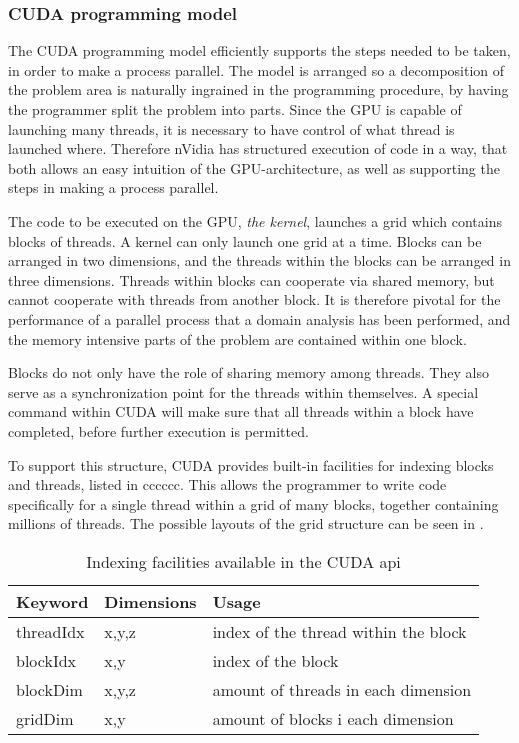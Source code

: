 \subsubsection{CUDA programming model}
The CUDA programming model efficiently supports the steps needed to be taken, in order to make a process parallel. The model is arranged so a decomposition of the problem area is naturally ingrained in the programming procedure, by having the programmer split the problem into parts. Since the GPU is capable of launching many threads, it is necessary to have control of what thread is launched where. Therefore nVidia has structured execution of code in a way, that both allows an easy intuition of the GPU-architecture, as well as supporting the steps in making a process parallel.

The code to be executed on the GPU, \emph{the kernel}, launches a grid which contains blocks of threads. A kernel can only launch one grid at a time. Blocks can be arranged in two dimensions, and the threads within the blocks can be arranged in three dimensions. Threads within blocks can cooperate via shared memory, but cannot cooperate with threads from another block. It is therefore pivotal for the performance of a parallel process that a domain analysis has been performed, and the memory intensive parts of the problem are contained within one block.

Blocks do not only have the role of sharing memory among threads. They also serve as a synchronization point for the threads within themselves. A special command within CUDA will make sure that all threads within a block have completed, before further execution is permitted.

To support this structure, CUDA provides built-in facilities for indexing blocks and threads, listed in cccccc. This allows the programmer to write code specifically for a single thread within a grid of many blocks, together containing millions of threads. The possible layouts of the grid structure can be seen in .

\begin{table}[htb]
	\centering
	\begin{tabular}{lll}
		\toprule
		Keyword & Dimensions & Usage \\
		\midrule
		threadIdx & x,y,z & index of the thread within the block \\
		blockIdx & x,y & index of the block  \\
		blockDim & x,y,z & amount of threads in each dimension \\
		gridDim & x,y & amount of blocks i each dimension \\
		\bottomrule
	\end{tabular}
	\caption{Indexing facilities available in the CUDA api}
	\label{cudaindex}
\end{table}


